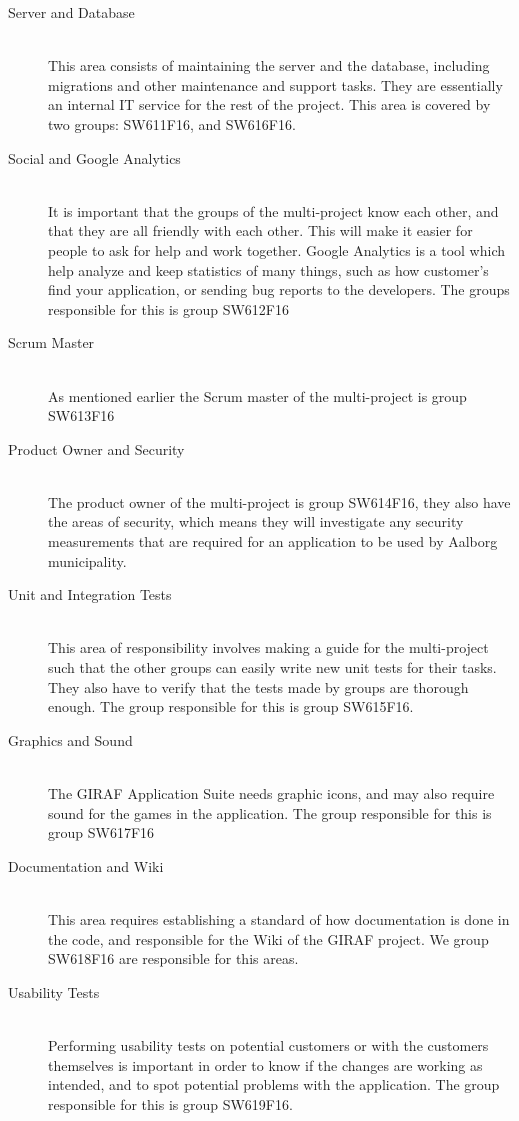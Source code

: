 \begin{description}
	\item[Server and Database] \hfill \\
	This area consists of maintaining the server and the database, including migrations and other maintenance and support tasks. They are essentially an internal IT service for the rest of the project. This area is covered by two groups: SW611F16, and SW616F16.
	\item[Social and Google Analytics] \hfill \\
	It is important that the groups of the multi-project know each other, and that they are all friendly with each other. 
	This will make it easier for people to ask for help and work together. 
	Google Analytics is a tool which help analyze and keep statistics of many things, such as how customer's find your application, or sending bug reports to the developers.
	The groups responsible for this is group SW612F16
	\item[Scrum Master] \hfill \\
	As mentioned earlier the Scrum master of the multi-project is group SW613F16
	\item[Product Owner and Security] \hfill \\
	The product owner of the multi-project is group SW614F16, they also have the areas of security, which means they will investigate any security measurements that are required for an application to be used by Aalborg municipality.
	\item[Unit and Integration Tests] \hfill \\
	This area of responsibility involves making a guide for the multi-project such that the other groups can easily write new unit tests for their tasks.
	They also have to verify that the tests made by groups are thorough enough.
	The group responsible for this is group SW615F16.
	\item[Graphics and Sound] \hfill \\
	The GIRAF Application Suite needs graphic icons, and may also require sound for the games in the application. 
	The group responsible for this is group SW617F16
	\item[Documentation and Wiki] \hfill \\
	This area requires establishing a standard of how documentation is done in the code, and responsible for the Wiki of the GIRAF project. We group SW618F16 are responsible for this areas.
	\item[Usability Tests] \hfill \\
	Performing usability tests on potential customers or with the customers themselves is important in order to know if the changes are working as intended, and to spot potential problems with the application. The group responsible for this is group SW619F16.	
\end{description}

